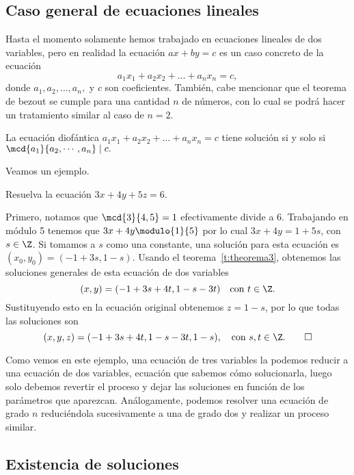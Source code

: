 \subsection{Caso general de ecuaciones lineales}

Hasta el momento solamente hemos trabajado en ecuaciones lineales de dos variables, pero en realidad la ecuación
$ax + by = c$ es un caso concreto de la ecuación
\[
    a_1 x_1 + a_2 x_2 + \ldots + a_n x_n = c,
\]
donde $a_1, a_2, \dots, a_n,$ y $c$ son coeficientes.
También, cabe mencionar que el teorema de bezout se cumple para una cantidad $n$ de números, con lo cual
se podrá hacer un tratamiento similar al caso de $n = 2$.

\begin{theorem.box}{}{}
    La ecuación diofántica $a_1 x_1 + a_2 x_2 + \ldots + a_n x_n = c$ tiene solución si y solo si $\mcd {a_1}{a_2,\cdots,a_n} \mid c.$
\end{theorem.box}

Veamos un ejemplo.

\begin{example}
    Resuelva la ecuación $3x + 4y + 5z = 6$.
\end{example}
\begin{solution}
    Primero, notamos que $\mcd{3}{4,5} = 1$ efectivamente divide a 6.
    Trabajando en módulo 5 tenemos que $3x + 4y\modulo{1}{5}$ por lo cual $3x + 4y = 1 + 5s$, con $s \in \Z$.
    Si tomamos a $s$ como una constante, una solución para esta ecuación es $(x_0, y_0) = (-1 + 3s, 1 - s)$.
    Usando el teorema~\ref{t:theorema3}, obtenemos las soluciones generales de esta ecuación de dos variables
    \[
        (x,y) = (-1+3s+4t, 1-s-3t)\quad\text{con}\ t \in \Z.
    \]
    Sustituyendo esto en la ecuación original obtenemos $z = 1 - s$, por lo que todas las soluciones son
    \[
        (x,y,z)=(-1+3s+4t,1-s-3t,1-s), \quad \text{con}\ s,t \in \Z.\qedhere
    \]
\end{solution}

Como vemos en este ejemplo, una ecuación de tres variables la podemos reducir a una ecuación de dos variables,
ecuación que sabemos cómo solucionarla, luego solo debemos revertir el proceso y dejar las soluciones en función
de los parámetros que aparezcan.
Análogamente, podemos resolver una ecuación de grado $n$ reduciéndola sucesivamente a una de grado dos y realizar un proceso similar.


\subsection{Existencia de soluciones}

